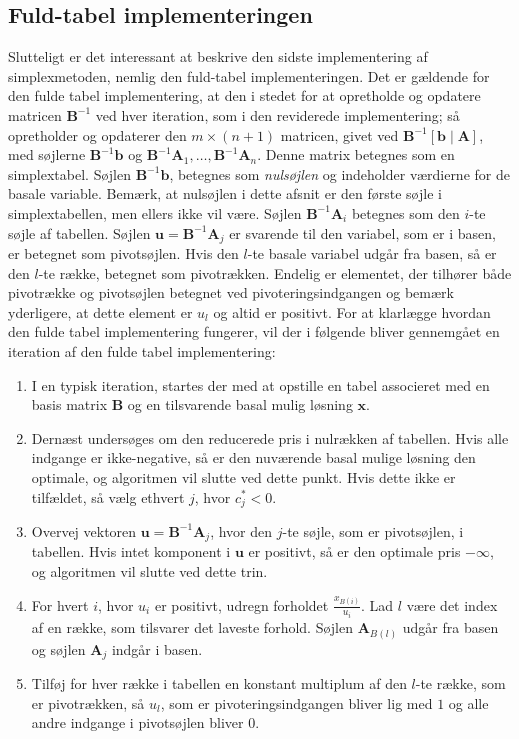 \subsection{Fuld-tabel implementeringen}
Slutteligt er det interessant at beskrive den sidste implementering af simplexmetoden, nemlig den fuld-tabel implementeringen. 
Det er gældende for den fulde tabel implementering, at den i stedet for at opretholde og opdatere matricen $\mathbf{B}^{-1}$ ved hver iteration, som i den reviderede implementering; så opretholder og opdaterer den $m \times (n+1)$ matricen, givet ved $\mathbf{B}^{-1} \left [ \mathbf{b} \mid \mathbf{A} \right ]$, med søjlerne $\mathbf{B}^{-1}\mathbf{b}$ og $\mathbf{B}^{-1}\mathbf{A}_1,\ldots,\mathbf{B}^{-1}\mathbf{A}_n$. 
Denne matrix betegnes som en simplextabel.
Søjlen $\mathbf{B}^{-1}\mathbf{b}$, betegnes som \textit{nulsøjlen} og indeholder værdierne for de basale variable.
Bemærk, at nulsøjlen i dette afsnit er den første søjle i simplextabellen, men ellers ikke vil være.
Søjlen $\mathbf{B}^{-1}\mathbf{A}_i$ betegnes som den $i$-te søjle af tabellen.
Søjlen $\mathbf{u} = \mathbf{B}^{-1}\mathbf{A}_j$ er svarende til den variabel, som er i basen, er betegnet som pivotsøjlen. 
Hvis den $l$-te basale variabel udgår fra basen, så er den $l$-te række, betegnet som pivotrækken. 
Endelig er elementet, der tilhører både pivotrække og pivotsøjlen betegnet ved pivoteringsindgangen og bemærk yderligere, at dette element er $u_l$ og altid er positivt. 
For at klarlægge hvordan den fulde tabel implementering fungerer, vil der i følgende bliver gennemgået en iteration af den fulde tabel implementering: 
%
\begin{col}{}{}
\begin{enumerate}
\item I en typisk iteration, startes der med at opstille en tabel associeret med en basis matrix $\mathbf{B}$ og en tilsvarende basal mulig løsning $\mathbf{x}.$
\item Dernæst undersøges om den reducerede pris i nulrækken af tabellen.
Hvis alle indgange er ikke-negative, så er den nuværende basal mulige løsning den optimale, og algoritmen vil slutte ved dette punkt.
Hvis dette ikke er tilfældet, så vælg ethvert $j$, hvor $c_j^* < 0$.
\item Overvej vektoren $\mathbf{u}=\mathbf{B}^{-1}\mathbf{A}_j$, hvor den $j$-te søjle, som er pivotsøjlen, i tabellen. Hvis intet komponent i $\mathbf{u}$ er positivt, så er den optimale pris $-\infty$, og algoritmen vil slutte ved dette trin. 
\item For hvert $i$, hvor $u_i$ er positivt, udregn forholdet $\frac{x_{B(i)}}{u_i}$. Lad $l$ være det index  af en række, som tilsvarer det laveste forhold.
Søjlen $\mathbf{A}_{B(l)}$ udgår fra basen og søjlen $\mathbf{A}_j$ indgår i basen. 
\item Tilføj for hver række i tabellen en konstant multiplum af den $l$-te række, som er pivotrækken, så $u_l$, som er pivoteringsindgangen bliver lig med $1$ og alle andre indgange i pivotsøjlen bliver 0. 
\end{enumerate}
\end{col}
\noindent
%